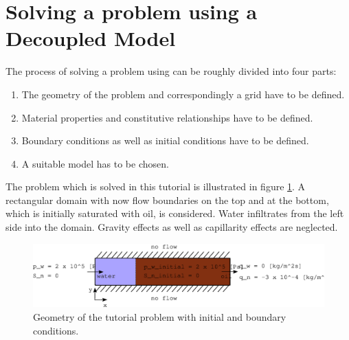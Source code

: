 \section[Decoupled model]{Solving a problem using a Decoupled Model}\label{tutorial-decoupled}

The process of solving a problem using \Dumux can be roughly divided into four parts: 
\begin{enumerate}
 \item The geometry of the problem and correspondingly a grid have to be defined.
 \item Material properties and constitutive relationships have to be defined.
 \item Boundary conditions as well as initial conditions have to be defined.
 \item A suitable model has to be chosen.
\end{enumerate}

The problem which is solved in this tutorial is illustrated in figure \ref{tutorial-decoupled:problemfigure}. A rectangular domain with now flow boundaries on the top and at the bottom, which is initially saturated with oil, is considered. Water infiltrates from the left side into the domain. Gravity effects as well as capillarity effects are neglected.

\begin{figure}[h]
\centering
\includegraphics[width=0.9\linewidth,keepaspectratio]{EPS/tutorial-problemconfiguration}
\caption{Geometry of the tutorial problem with initial and boundary conditions.}\label{tutorial-decoupled:problemfigure}
\end{figure}

